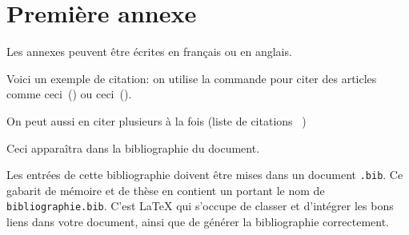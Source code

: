 \chapter{Premi\`ere annexe}
\label{annexe:A}

Les annexes peuvent \^etre \'ecrites en fran\c{c}ais ou en anglais.

Voici un exemple de citation: on utilise la commande \verb@cite@ pour citer des articles comme ceci~(\cite{Abr.96-BBook})
ou ceci~(\cite{Hoa.85-CSP}). 

On peut aussi en citer plusieurs \`a la fois (liste de citations~
\cite{Jac.83-JSD,Mil.89-CCS,INRIA.cadp})

Ceci appara\^itra dans la bibliographie du document.

Les entr\'ees de cette bibliographie doivent \^etre mises dans un document \texttt{.bib}. Ce gabarit de m\'emoire et de th\`ese en contient un portant le nom de \texttt{bibliographie.bib}. C'est LaTeX qui s'occupe de classer et d'int\'egrer les bons liens dans votre document, ainsi que de g\'en\'erer la bibliographie correctement.

